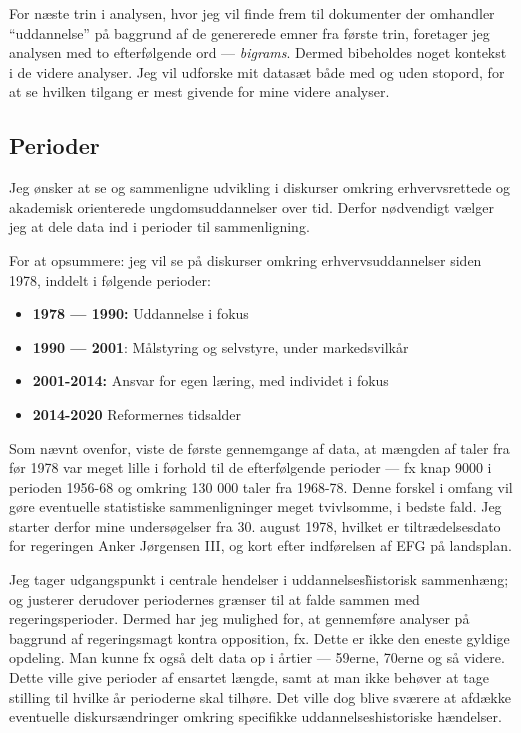 For næste trin i analysen, hvor jeg vil finde frem til dokumenter der omhandler “uddannelse” på baggrund af de genererede emner fra første trin, foretager jeg analysen med to efterfølgende ord — \textit{bigrams}.
Dermed bibeholdes noget kontekst i de videre analyser.
Jeg vil udforske mit datasæt både med og uden stopord, for at se hvilken tilgang er mest givende for mine videre analyser.

\subsection{Perioder}\label{sec:periods}
Jeg ønsker at se og sammenligne udvikling i diskurser omkring erhvervsrettede og akademisk orienterede ungdomsuddannelser over tid.
Derfor nødvendigt vælger jeg at dele data ind i perioder til sammenligning.

For at opsummere: jeg vil se på diskurser omkring erhvervsuddannelser siden 1978, inddelt i følgende perioder:

\begin{itemize}
  \item
    \textbf{1978 — 1990:} Uddannelse i fokus
  \item
    \textbf{1990 — 2001}: Målstyring og selvstyre, under markedsvilkår
  \item
    \textbf{2001-2014:} Ansvar for egen læring, med individet i fokus
  \item
    \textbf{2014-2020} Reformernes tidsalder
\end{itemize}

Som nævnt ovenfor, viste de første gennemgange af data, at mængden af taler fra før 1978 var meget lille i forhold til de efterfølgende perioder — fx knap 9000 i perioden 1956-68 og omkring 130 000 taler fra 1968-78.
Denne forskel i omfang vil gøre eventuelle statistiske sammenligninger meget tvivlsomme, i bedste fald.
Jeg starter derfor mine undersøgelser fra 30. august 1978, hvilket er tiltrædelsesdato for regeringen Anker Jørgensen III, og kort efter indførelsen af EFG på landsplan.

Jeg tager udgangspunkt i centrale hendelser i uddannelses\~historisk sammenhæng; og justerer derudover periodernes grænser til at falde sammen med regeringsperioder.
Dermed har jeg mulighed for, at gennemføre analyser på baggrund af regeringsmagt kontra opposition, fx.
Dette er ikke den eneste gyldige opdeling.
Man kunne fx også delt data op i årtier — 59erne, 70erne og så videre.
Dette ville give perioder af ensartet længde, samt at man ikke behøver at tage stilling til hvilke år perioderne skal tilhøre.
Det ville dog blive sværere at afdække eventuelle diskursændringer omkring specifikke uddannelseshistoriske hændelser.

